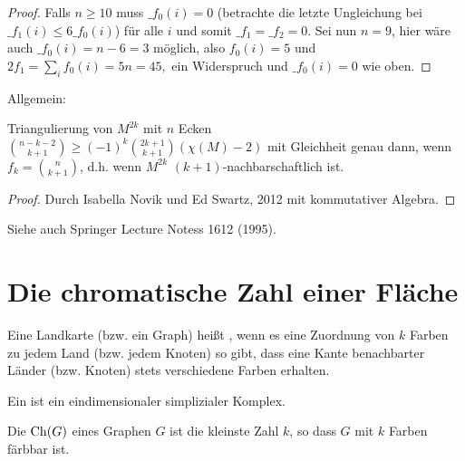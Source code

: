\begin{st}[Kühnel, 1985]
\begin{proof}
        Falls $n \ge 10$ muss $\_f_0(i) = 0$ (betrachte die letzte Ungleichung bei $\_f_1(i) \le 6 \_f_0(i)$) für alle $i$ und somit $\_f_1 = \_f_2 = 0$.
        Sei nun $n = 9$, hier wäre auch $\_f_0(i) = n-6 = 3$ möglich, also $f_0(i) = 5$ und
        \begin{math}
            2 f_1 = \sum_{i} f_0(i) = 5n = 45,
        \end{math}
        ein Widerspruch und $\_f_0(i) = 0$ wie oben.
    \end{proof}
\end{st}

Allgemein:

\begin{conj}[Kühnel]
    Triangulierung von $M^{2k}$ mit $n$ Ecken
    \begin{math}
        \binom{n-k-2}{k+1}
        \ge (-1)^k \binom{2k+1}{k+1} (\chi(M) - 2)
    \end{math}
    mit Gleichheit genau dann, wenn $f_k = \binom{n}{k+1}$, d.h. wenn $M^{2k}$ $(k+1)$-nachbarschaftlich ist.
    \begin{proof}
        Durch Isabella Novik und Ed Swartz, 2012 mit kommutativer Algebra.
    \end{proof}
\end{conj}

Siehe auch Springer Lecture Notess 1612 (1995).




\section{Die chromatische Zahl einer Fläche}

\begin{df}
    Eine Landkarte (bzw. ein Graph) heißt , wenn es eine Zuordnung von $k$ Farben zu jedem Land (bzw. jedem Knoten) so gibt, dass eine Kante benachbarter Länder (bzw. Knoten) stets verschiedene Farben erhalten.
\end{df}

\begin{df}
    Ein  ist ein eindimensionaler simplizialer Komplex.
\end{df}

\begin{df}
    Die  $\operatorname { Ch }(G)$ eines Graphen $G$ ist die kleinste Zahl $k$, so dass $G$ mit $k$ Farben färbbar ist.
\end{df}

